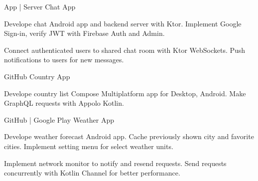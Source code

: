 \begin{cventries}
  \cventry
  {App | Server}
  {Chat App}
  {}
  {}
  {
    \begin{cvitems}
      \item {
      Develope chat Android app and backend server with Ktor.
      Implement Google Sign-in, verify JWT with Firebase Auth and Admin.
      }
      \item {
      Connect authenticated users to shared chat room with Ktor WebSockets.
      Push notifications to users for new messages.
      }
    \end{cvitems}        
  }
  
  \cventry
  {GitHub}
  {Country App}
  {}
  {}
  {
    \begin{cvitems}
      \item {
        Develope country list Compose Multiplatform app for Desktop, Android.
        Make GraphQL requests with Appolo Kotlin.
      }
    \end{cvitems}        
  }
  
  \cventry
  {GitHub | Google Play}
  {Weather App}
  {}
  {}
  {
    \begin{cvitems}
      \item {
      Develope weather forecast Android app.
      Cache previously shown city and favorite cities.
      Implement setting menu for select weather units.
      }
      \item {
      Implement network monitor to notify and resend requests.
      Send requests concurrently with Kotlin Channel for better performance.
      }
    \end{cvitems}        
  }
\end{cventries}